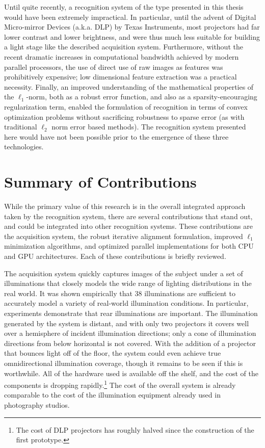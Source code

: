 Until quite recently, a recognition system of the type presented in this thesis
would have been extremely impractical.  In particular, until the advent of
Digital Micro-mirror Devices (a.k.a. DLP) by Texas Instruments, most projectors
had far lower contrast and lower brightness, and were thus much less suitable
for building a light stage like the described acquisition system.  Furthermore,
without the recent dramatic increases in computational bandwidth achieved by
modern parallel processors, the use of direct use of raw images as features was
prohibitively expensive; low dimensional feature extraction was a practical
necessity.  Finally, an improved understanding of the mathematical properties
of the $\ell_1$-norm, both as a robust error function, and also as a
sparsity-encouraging regularization term, enabled the formulation of recognition in
terms of convex optimization problems without sacrificing robustness to sparse
error (as with traditional $\ell_2$ norm error based methods).  The recognition
system presented here would have not been possible prior to the emergence of
these three technologies.

\section{Summary of Contributions}
While the primary value of this research is in the overall integrated approach taken by
the recognition system, there are several contributions that stand out, and could be
integrated into other recognition systems.  These contributions
are the acquisition system, the robust iterative alignment formulation,
improved $\ell_1$ minimization algorithms, and optimized parallel
implementations for both CPU and GPU architectures.  Each of these
contributions is briefly reviewed.

The acquisition system quickly captures images of the subject under a set of
illuminations that closely models the wide range of lighting distributions in
the real world.  It was shown empirically that 38 illuminations are sufficient
to accurately model a variety of real-world illumination conditions.  In
particular, experiments demonstrate that rear illuminations are important.  The
illumination generated by the system is distant, and with only two projectors
it covers well over a hemisphere of incident illumination directions; only a
cone of illumination directions from below horizontal is not covered.  With the
addition of a projector that bounces light off of the floor, the system could
even achieve true omnidirectional illumination coverage, though it remains to
be seen if this is worthwhile.  All of the hardware used is available off the
shelf, and the cost of the components is dropping rapidly.\footnote{The cost of
DLP projectors has roughly halved since the construction of the first
prototype.} The cost of the overall system is already comparable to the cost of
the illumination equipment already used in photography studios.  

